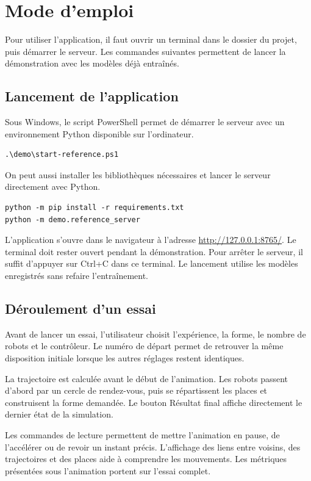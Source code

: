 \clearpage
{}
{}
\chapter*{Mode d'emploi}
\label{ann:demarrage}
Pour utiliser l'application, il faut ouvrir un terminal dans le dossier du projet, puis démarrer le serveur. Les commandes suivantes permettent de lancer la démonstration avec les modèles déjà entraînés.

\section*{Lancement de l'application}
Sous Windows, le script PowerShell permet de démarrer le serveur avec un environnement Python disponible sur l'ordinateur.
\begin{verbatim}
.\demo\start-reference.ps1
\end{verbatim}
On peut aussi installer les bibliothèques nécessaires et lancer le serveur directement avec Python.
\begin{verbatim}
python -m pip install -r requirements.txt
python -m demo.reference_server
\end{verbatim}
L'application s'ouvre dans le navigateur à l'adresse \url{http://127.0.0.1:8765/}. Le terminal doit rester ouvert pendant la démonstration. Pour arrêter le serveur, il suffit d'appuyer sur Ctrl+C dans ce terminal. Le lancement utilise les modèles enregistrés sans refaire l'entraînement.

\section*{Déroulement d'un essai}
Avant de lancer un essai, l'utilisateur choisit l'expérience, la forme, le nombre de robots et le contrôleur. Le numéro de départ permet de retrouver la même disposition initiale lorsque les autres réglages restent identiques.

La trajectoire est calculée avant le début de l'animation. Les robots passent d'abord par un cercle de rendez-vous, puis se répartissent les places et construisent la forme demandée. Le bouton Résultat final affiche directement le dernier état de la simulation.

Les commandes de lecture permettent de mettre l'animation en pause, de l'accélérer ou de revoir un instant précis. L'affichage des liens entre voisins, des trajectoires et des places aide à comprendre les mouvements. Les métriques présentées sous l'animation portent sur l'essai complet.

